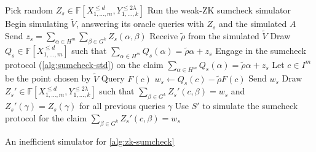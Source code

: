 \documentclass[english,12pt]{reedthesis}
\theoremstyle{plain}
\theoremstyle{definition}
\theoremstyle{remark}
\begin{document}
\begin{algorithm}[htbp]
  Pick random
  $Z_{s} \in \mathbb{F}[X_{1, \ldots, m}^{\le d}, Y_{1, \ldots, k}^{\le 2\lambda}]$\;
  Run the weak-ZK sumcheck simulator\; %
  Begin simulating $\tilde{V}$, answering its oracle queries with $Z_{s}$ and
  the simulated $A$\;
  Send $z_{s} = \sum_{\alpha \in H^{m}}\sum_{\beta \in G^{k}}Z_{s}(\alpha, \beta)$\;
  Receive $\tilde{\rho}$ from the simulated $\tilde{V}$\;
  Draw $Q_{s} \in \mathbb{F}[X_{1, \ldots, m}^{\le d}]$ such that
  $\sum_{\alpha \in H^{m}}Q_{s}(\alpha) = \tilde{\rho}\alpha + z_{s}$\;
  Engage in the sumcheck protocol (\cref{alg:sumcheck-std}) on the claim
  $\sum_{\alpha \in H^{m}}Q_{s}(\alpha) = \tilde{\rho}\alpha + z_{s}$\;
  Let $c \in I^{m}$ be the point chosen by $\tilde{V}$\;
  Query $F(c)$\;
  $w_{s} \leftarrow Q_{s}(c) - \tilde{\rho}F(c)$\;
  Send $w_{s}$\;
  Draw $Z_{s}' \in \mathbb{F}[X_{1, \ldots, m}^{\le d}, Y_{1, \ldots, k}^{\le 2\lambda}]$ such that
  $\sum_{\beta \in G^{k}}Z_{s}'(c, \beta) = w_{s}$ and $Z_{s}'(\gamma) = Z_{s}(\gamma)$ for all
  previous queries $\gamma$\;
  Use $S'$ to simulate the sumcheck protocol for the claim
  $\sum_{\beta \in G^{k}}Z_{s}'(c, \beta) = w_{s}$\;
  \;
  \caption{An inefficient simulator for
    \cref{alg:zk-sumcheck}~\cite[p.\ 15:33]{CFGS22}}\label{alg:zk-sumcheck-sim}
\end{algorithm}
\end{document}
